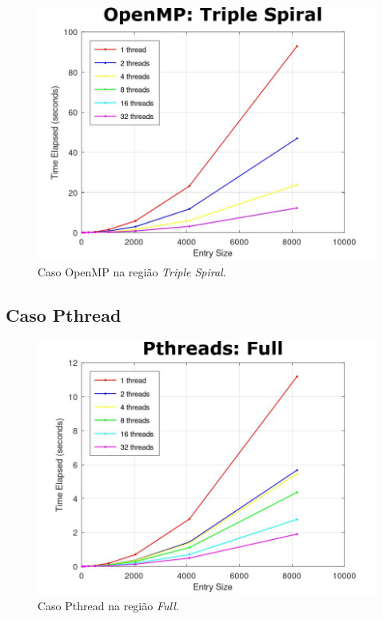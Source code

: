 \documentclass[a4paper, 12pt]{article}
\begin{document}
\begin{figure}[H]
	\centering
	\includegraphics[scale=0.45]{omp_triple_spiral}
	\caption{Caso OpenMP na região \textit{Triple Spiral}.}
\end{figure}

\subsection{Caso Pthread}

\begin{figure}[H]
	\centering
	\includegraphics[scale=0.45]{pth_full}
	\caption{Caso Pthread na região \textit{Full}.}
\end{figure}
\end{document}

